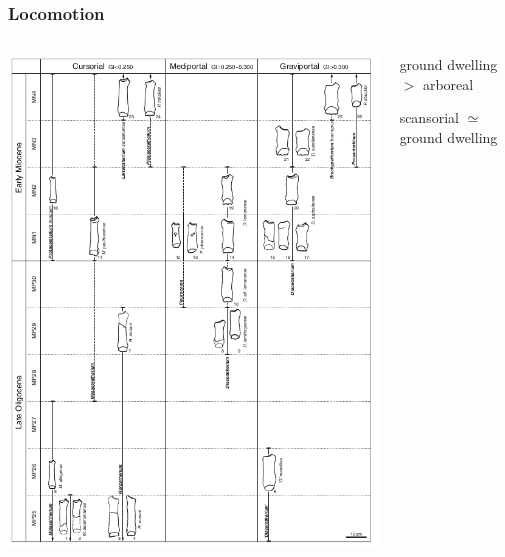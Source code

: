 \documentclass{beamer}
\begin{document}
\begin{frame}
  \frametitle{Locomotion}
  \begin{columns}
    \begin{column}{0.5\textwidth}
      \includegraphics[height = 0.8\textheight, width = \textwidth, keepaspectratio = true]{figure/scherler}

      \tiny{}
    \end{column}
    \begin{column}{0.5\textwidth}
      ground dwelling \(>\) arboreal

      \vspace{0.5cm}

      scansorial \(\simeq\) ground dwelling 
    \end{column}
  \end{columns}
\end{frame}
\end{document}
